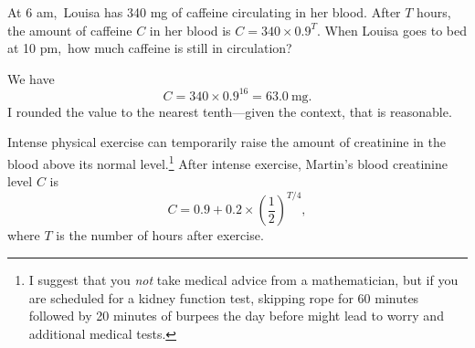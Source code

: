 \documentclass[12pt,fleqn,answers]{exam}
\newcommand\AM{{\sc am}}
\newcommand\PM{{\sc pm}}
\begin{document}
\begin{questions}
\begin{solution}[2.5in]
\begin{solution}
\end{solution}

\question [2]  At 6 \AM,\, Louisa has 340 mg of caffeine circulating 
in her blood. After $T$ hours, the amount of caffeine $C$ in her blood is
\(
     C = 340  \times  0.9^T
\).
When Louisa goes to bed at 10 \PM,\, how much caffeine is
still in circulation?
\begin{solution}[1.5in] We have
    \begin{equation*}
        C = 340 \times 0.9^{16} = \SI{63.0}{\milli\gram}.
    \end{equation*}
I rounded the value to the nearest tenth---given the context, that
is reasonable.
\end{solution}

\question Intense physical exercise can temporarily raise the amount
of creatinine in the blood above its normal level.\footnote{I suggest
that you \emph{not} take medical advice from a mathematician, but
if you are scheduled for a kidney function test, skipping rope
for 60 minutes followed by 20 minutes of burpees the day 
before might lead to worry and additional medical tests.} After intense exercise,
 Martin's blood creatinine level $C$ is 
\begin{equation*}
    C = 0.9 + 0.2 \times \left(\frac{1}{2} \right)^{T/4},
\end{equation*}
where $T$ is the number of hours after exercise. 
\end{solution}
\end{questions}
\end{document}
